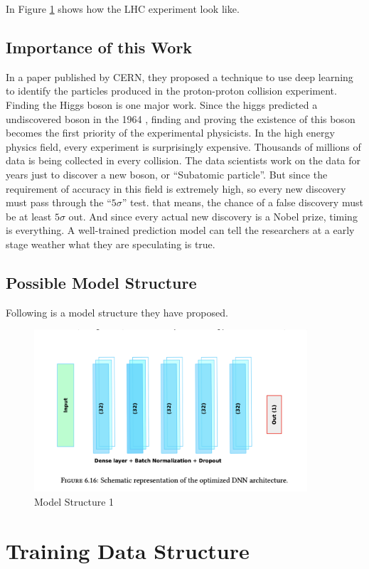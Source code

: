 \documentclass[a4paper,12pt, oneside]{article}
\begin{document}
In Figure \ref{LHC_Computer_Simulation} shows how the LHC experiment look like.
%
\newpage
\subsection{Importance of this Work}
In a paper published by CERN\cite{Giannini:2730094}, they proposed a technique to use deep learning to identify the particles produced in the proton-proton collision experiment. Finding the Higgs boson is one major work. Since the higgs predicted a undiscovered boson in the 1964 \cite{PhysRevLett.13.508}, finding and proving the existence of this boson becomes the first priority of the experimental physicists. In the high energy physics field, every experiment is surprisingly expensive. Thousands of millions of data is being collected in every collision. The data scientists work on the data for years just to discover a new boson, or ``Subatomic particle''. But since the requirement of accuracy in this field is extremely high, so every new discovery must pass through the ``$5 \sigma$'' test. that means, the chance of a false discovery must be at least $5 \sigma$ out. And since every actual new discovery is a Nobel prize, timing is everything. A well-trained prediction model can tell the researchers at a early stage weather what they are speculating is true.
\subsection{Possible Model Structure}
Following is a model structure they\cite{Giannini:2730094} have proposed.
\begin{figure}[H]
\centering
\includegraphics[width = 4in]{fig1.png}
\caption{Model Structure 1 \cite{Giannini:2730094}}\label{LHC_Computer_Simulation}
\end{figure}
\newpage
\section{Training Data Structure}
\end{document}
